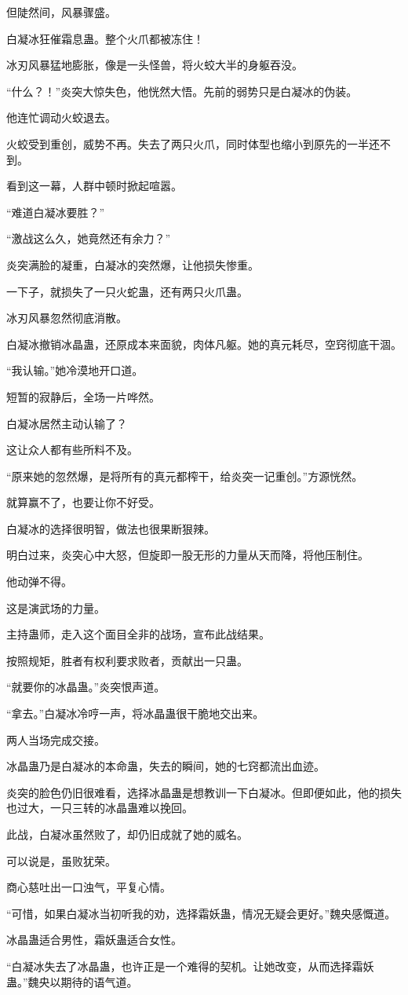 \begin{this_body}
但陡然间，风暴骤盛。

白凝冰狂催霜息蛊。整个火爪都被冻住！

冰刃风暴猛地膨胀，像是一头怪兽，将火蛟大半的身躯吞没。

“什么？！”炎突大惊失色，他恍然大悟。先前的弱势只是白凝冰的伪装。

他连忙调动火蛟退去。

火蛟受到重创，威势不再。失去了两只火爪，同时体型也缩小到原先的一半还不到。

看到这一幕，人群中顿时掀起喧嚣。

“难道白凝冰要胜？”

“激战这么久，她竟然还有余力？”

炎突满脸的凝重，白凝冰的突然爆，让他损失惨重。

一下子，就损失了一只火蛇蛊，还有两只火爪蛊。

冰刃风暴忽然彻底消散。

白凝冰撤销冰晶蛊，还原成本来面貌，肉体凡躯。她的真元耗尽，空窍彻底干涸。

“我认输。”她冷漠地开口道。

短暂的寂静后，全场一片哗然。

白凝冰居然主动认输了？

这让众人都有些所料不及。

“原来她的忽然爆，是将所有的真元都榨干，给炎突一记重创。”方源恍然。

就算赢不了，也要让你不好受。

白凝冰的选择很明智，做法也很果断狠辣。

明白过来，炎突心中大怒，但旋即一股无形的力量从天而降，将他压制住。

他动弹不得。

这是演武场的力量。

主持蛊师，走入这个面目全非的战场，宣布此战结果。

按照规矩，胜者有权利要求败者，贡献出一只蛊。

“就要你的冰晶蛊。”炎突恨声道。

“拿去。”白凝冰冷哼一声，将冰晶蛊很干脆地交出来。

两人当场完成交接。

冰晶蛊乃是白凝冰的本命蛊，失去的瞬间，她的七窍都流出血迹。

炎突的脸色仍旧很难看，选择冰晶蛊是想教训一下白凝冰。但即便如此，他的损失也过大，一只三转的冰晶蛊难以挽回。

此战，白凝冰虽然败了，却仍旧成就了她的威名。

可以说是，虽败犹荣。

商心慈吐出一口浊气，平复心情。

“可惜，如果白凝冰当初听我的劝，选择霜妖蛊，情况无疑会更好。”魏央感慨道。

冰晶蛊适合男性，霜妖蛊适合女性。

“白凝冰失去了冰晶蛊，也许正是一个难得的契机。让她改变，从而选择霜妖蛊。”魏央以期待的语气道。

\end{this_body}

